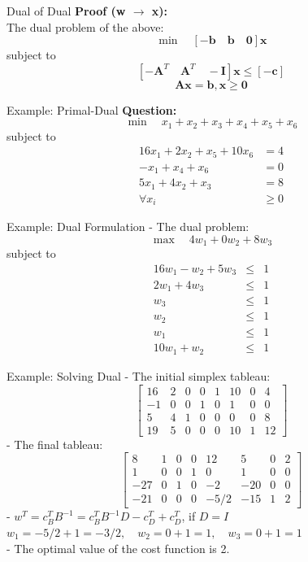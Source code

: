 \documentclass[aspectratio=169,hyperref,UTF8,CJK]{beamer}
\begin{document}
\begin{frame}{Dual of Dual}
\textbf{Proof (w \(\rightarrow\) x):} \\
The dual problem of the above:
\[
\min \quad [-\mathbf{b} \quad \mathbf{b} \quad \mathbf{0}] \mathbf{x}
\]
subject to
\[
\left[-\mathbf{A}^{T}\quad \mathbf{A}^{T}\quad -\mathbf{I}\right]\mathbf{x} \leq \left[-\mathbf{c}\right]
\]
\[
\mathbf{A}\mathbf{x} = \mathbf{b},\mathbf{x}\geq \mathbf{0}
\]
\end{frame}

\begin{frame}{Example: Primal-Dual}
\textbf{Question:}
\[
\min \quad x_1 + x_2 + x_3 + x_4 + x_5 + x_6
\]
subject to
\begin{align*}
16x_1 + 2x_2 + x_5 + 10x_6 &= 4 \\
-x_1 + x_4 + x_6 &= 0 \\
5x_1 + 4x_2 + x_3 &= 8 \\
\forall x_i &\geq 0
\end{align*}
\end{frame}

\begin{frame}{Example: Dual Formulation}
- The dual problem:
\[
\max \quad 4w_1 + 0w_2 + 8w_3
\]
subject to
\[\begin{array}{rcl} 16w_1 - w_2 + 5w_3 & \leq & 1 \\ 2w_1 + 4w_3 & \leq & 1 \\ w_3 & \leq & 1 \\ w_2 & \leq & 1 \\ w_1 & \leq & 1 \\ 10w_1 + w_2 & \leq & 1 \end{array}\]
\end{frame}

\begin{frame}{Example: Solving Dual}
- The initial simplex tableau:
\[
\begin{bmatrix}
16 & 2 & 0 & 0 & 1 & 10 & 0 & 4 \\
-1 & 0 & 0 & 1 & 0 & 1 & 0 & 0 \\
5 & 4 & 1 & 0 & 0 & 0 & 0 & 8 \\
19 & 5 & 0 & 0 & 0 & 10 & 1 & 12
\end{bmatrix}
\]
- The final tableau:
\[
\begin{bmatrix}
8 & 1 & 0 & 0 & 12 & 5 & 0 & 2 \\
1 & 0 & 0 & 1 & 0 & 1 & 0 & 0 \\
-27 & 0 & 1 & 0 & -2 & -20 & 0 & 0 \\
-21 & 0 & 0 & 0 & -5/2 & -15 & 1 & 2
\end{bmatrix}
\]
- \(w^T = c_B^T B^{-1} = c_B^T B^{-1} D - c_D^T + c_D^T\), if \(D = I\) \\
\(w_1 = -5/2 + 1 = -3/2, \quad w_2 = 0 + 1 = 1, \quad w_3 = 0 + 1 = 1\) \\
- The optimal value of the cost function is 2.
\end{frame}
\end{document}
